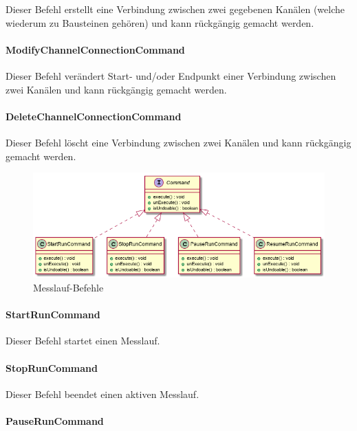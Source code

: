 \documentclass[parskip=full]{scrartcl}
\begin{document}
Dieser Befehl erstellt eine Verbindung zwischen zwei gegebenen Kanälen (welche wiederum zu Bausteinen gehören) und kann rückgängig gemacht werden.

\paragraph{ModifyChannelConnectionCommand}

Dieser Befehl verändert Start- und/oder Endpunkt einer Verbindung zwischen zwei Kanälen und kann rückgängig gemacht werden.

\paragraph{DeleteChannelConnectionCommand}

Dieser Befehl löscht eine Verbindung zwischen zwei Kanälen und kann rückgängig gemacht werden.

\begin{figure}[htbp]
	\begin{center}
		\includegraphics[width = 12cm]{Grafiken/Commands3.png}
		\caption{Messlauf-Befehle}
		\label{Commands3}
	\end{center}
\end{figure}

\paragraph{StartRunCommand}

Dieser Befehl startet einen Messlauf.

\paragraph{StopRunCommand}

Dieser Befehl beendet einen aktiven Messlauf.

\paragraph{PauseRunCommand}
\end{document}
